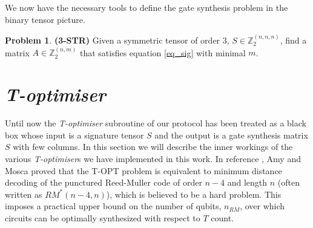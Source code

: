 \documentclass[notitlepage]{article}
\theoremstyle{definition}
\theoremstyle{problem}
\newtheorem{problem}{Problem}[section]
\theoremstyle{lemma}
\begin{document}
We now have the necessary tools to define the gate synthesis problem in the binary tensor picture.
\theoremstyle{problem}

\begin{problem}{\textbf{(3-STR)}}
	Given a symmetric tensor of order 3, $S\in \mathbb{Z}_2^{(n,n,n)}$, find a matrix $A \in \mathbb{Z}_2^{(n,m)}$ that satisfies equation \ref{eq_sig} with minimal $m$.
\end{problem}

\section{\emph{T-optimiser}}
Until now the \emph{T-optimiser} subroutine of our protocol has been treated as a black box whose input is a signature tensor $S$ and the output is a gate synthesis matrix $S$ with few columns. In this section we will describe the inner workings of the various \emph{T-optimiser}s we have implemented in this work. In reference \cite{3_Amy_2016}, Amy and Mosca proved that the T-OPT problem is equivalent to minimum distance decoding of the punctured Reed-Muller code of order $n-4$ and length $n$ (often written as $RM^*(n-4, n)$), which is believed to be a hard problem. This imposes a practical upper bound on the number of qubits, $n_{RM}$, over which circuits can be optimally synthesized with respect to $T$ count.
\end{document}
